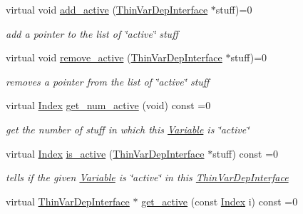 \begin{DoxyCompactItemize}
\item 
virtual void \mbox{\hyperlink{class_s_m_spp__di__unipi__it_1_1_variable_a0561f82eb0acc7697ef2da4375ca8030}{add\+\_\+active}} (\mbox{\hyperlink{class_s_m_spp__di__unipi__it_1_1_thin_var_dep_interface}{Thin\+Var\+Dep\+Interface}} $\ast$stuff)=0
\begin{DoxyCompactList}\small\item\em add a pointer to the list of \char`\"{}active\char`\"{} stuff \end{DoxyCompactList}\item 
virtual void \mbox{\hyperlink{class_s_m_spp__di__unipi__it_1_1_variable_a2e531111ee80083b60e8b3775ad3ce4f}{remove\+\_\+active}} (\mbox{\hyperlink{class_s_m_spp__di__unipi__it_1_1_thin_var_dep_interface}{Thin\+Var\+Dep\+Interface}} $\ast$stuff)=0
\begin{DoxyCompactList}\small\item\em removes a pointer from the list of \char`\"{}active\char`\"{} stuff \end{DoxyCompactList}\item 
virtual \mbox{\hyperlink{class_s_m_spp__di__unipi__it_1_1_variable_ad53d6229d7ec28555a9c9c2fd9abf773}{Index}} \mbox{\hyperlink{class_s_m_spp__di__unipi__it_1_1_variable_ad5813b427b1bca3b32f25a97be80c3fe}{get\+\_\+num\+\_\+active}} (void) const =0
\begin{DoxyCompactList}\small\item\em get the number of stuff in which this \mbox{\hyperlink{class_s_m_spp__di__unipi__it_1_1_variable}{Variable}} is \char`\"{}active\char`\"{} \end{DoxyCompactList}\item 
virtual \mbox{\hyperlink{class_s_m_spp__di__unipi__it_1_1_variable_ad53d6229d7ec28555a9c9c2fd9abf773}{Index}} \mbox{\hyperlink{class_s_m_spp__di__unipi__it_1_1_variable_a20d389d57c1714ae3c53978c3e6fa987}{is\+\_\+active}} (\mbox{\hyperlink{class_s_m_spp__di__unipi__it_1_1_thin_var_dep_interface}{Thin\+Var\+Dep\+Interface}} $\ast$stuff) const =0
\begin{DoxyCompactList}\small\item\em tells if the given \mbox{\hyperlink{class_s_m_spp__di__unipi__it_1_1_variable}{Variable}} is \char`\"{}active\char`\"{} in this \mbox{\hyperlink{class_s_m_spp__di__unipi__it_1_1_thin_var_dep_interface}{Thin\+Var\+Dep\+Interface}} \end{DoxyCompactList}\item 
virtual \mbox{\hyperlink{class_s_m_spp__di__unipi__it_1_1_thin_var_dep_interface}{Thin\+Var\+Dep\+Interface}} $\ast$ \mbox{\hyperlink{class_s_m_spp__di__unipi__it_1_1_variable_a5debd2bbc900586b78fb5243edc700f4}{get\+\_\+active}} (const \mbox{\hyperlink{class_s_m_spp__di__unipi__it_1_1_variable_ad53d6229d7ec28555a9c9c2fd9abf773}{Index}} i) const =0

\end{DoxyCompactItemize}
